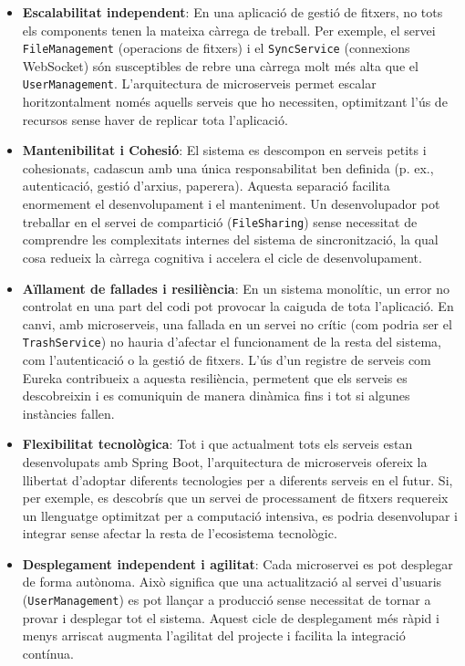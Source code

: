 \begin{itemize}
    \item \textbf{Escalabilitat independent}: En una aplicació de gestió de fitxers, no tots els components tenen la mateixa càrrega de treball. Per exemple, el servei \texttt{FileManagement} (operacions de fitxers) i el \texttt{SyncService} (connexions WebSocket) són susceptibles de rebre una càrrega molt més alta que el \texttt{UserManagement}. L'arquitectura de microserveis permet escalar horitzontalment només aquells serveis que ho necessiten, optimitzant l'ús de recursos sense haver de replicar tota l'aplicació.

    \item \textbf{Mantenibilitat i Cohesió}: El sistema es descompon en serveis petits i cohesionats, cadascun amb una única responsabilitat ben definida (p. ex., autenticació, gestió d'arxius, paperera). Aquesta separació facilita enormement el desenvolupament i el manteniment. Un desenvolupador pot treballar en el servei de compartició (\texttt{FileSharing}) sense necessitat de comprendre les complexitats internes del sistema de sincronització, la qual cosa redueix la càrrega cognitiva i accelera el cicle de desenvolupament.

    \item \textbf{Aïllament de fallades i resiliència}: En un sistema monolític, un error no controlat en una part del codi pot provocar la caiguda de tota l'aplicació. En canvi, amb microserveis, una fallada en un servei no crític (com podria ser el \texttt{TrashService}) no hauria d'afectar el funcionament de la resta del sistema, com l'autenticació o la gestió de fitxers. L'ús d'un registre de serveis com Eureka contribueix a aquesta resiliència, permetent que els serveis es descobreixin i es comuniquin de manera dinàmica fins i tot si algunes instàncies fallen.

    \item \textbf{Flexibilitat tecnològica}: Tot i que actualment tots els serveis estan desenvolupats amb Spring Boot, l'arquitectura de microserveis ofereix la llibertat d'adoptar diferents tecnologies per a diferents serveis en el futur. Si, per exemple, es descobrís que un servei de processament de fitxers requereix un llenguatge optimitzat per a computació intensiva, es podria desenvolupar i integrar sense afectar la resta de l'ecosistema tecnològic.

    \item \textbf{Desplegament independent i agilitat}: Cada microservei es pot desplegar de forma autònoma. Això significa que una actualització al servei d'usuaris (\texttt{UserManagement}) es pot llançar a producció sense necessitat de tornar a provar i desplegar tot el sistema. Aquest cicle de desplegament més ràpid i menys arriscat augmenta l'agilitat del projecte i facilita la integració contínua.
\end{itemize}

